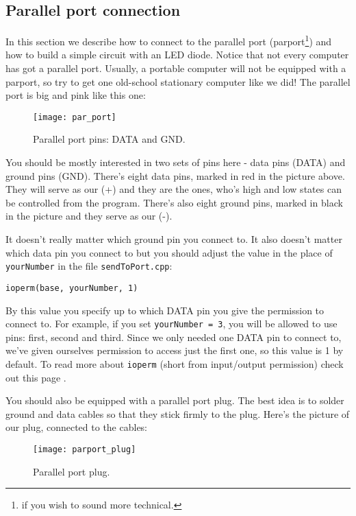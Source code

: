 \documentclass[12pt]{report}
\begin{document}
\subsection{Parallel port connection} \label{sec:parportcon}

In this section we describe how to connect to the parallel port (parport\footnote{if you wish to sound more technical.}) and how to build a simple circuit with an LED diode. Notice that not every computer has got a parallel port. Usually, a portable computer will not be equipped with a parport, so try to get one old-school stationary computer like we did! The parallel port is big and pink like this one:

\begin{figure}[H]
\centering\texttt{[image: par\_port]}
\caption{Parallel port pins: DATA and GND.}				
\label{fig:par_port}
\end{figure}

You should be mostly interested in two sets of pins here - data pins (DATA) and ground pins (GND). There's eight data pins, marked in red in the picture above. They will serve as our (+) and they are the ones, who's high and low states can be controlled from the program. There's also eight ground pins, marked in black in the picture and they serve as our (-).

It doesn't really matter which ground pin you connect to. It also doesn't matter which data pin you connect to but you should adjust the value in the place of \verb|yourNumber| in the file \verb|sendToPort.cpp|:

\begin{snugshade}
\verb|ioperm(base, yourNumber, 1)|
\end{snugshade}

By this value you specify up to which DATA pin you give the permission to connect to. For example, if you set \verb|yourNumber = 3|, you will be allowed to use pins: first, second and third. Since we only needed one DATA pin to connect to, we've given ourselves permission to access just the first one, so this value is 1 by default. To read more about \verb|ioperm| (short from input/output permission) check out this page \cite{ioperm}.

You should also be equipped with a parallel port plug. The best idea is to solder ground and data cables so that they stick firmly to the plug. Here's the picture of our plug, connected to the cables:

\begin{figure}[H]
\centering\texttt{[image: parport\_plug]}
\caption{Parallel port plug.}				
\label{fig:parport_plug}
\end{figure}
\end{document}
